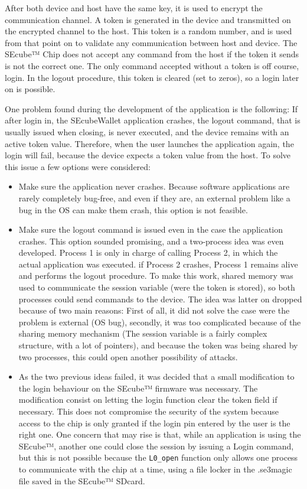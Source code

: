 After both device and host have the same key, it is used to encrypt the communication channel. A token is generated in the device and transmitted on the encrypted channel to the host. This token is a random number, and is used from that point on to validate any communication between host and device. The SEcube™ Chip does not accept any command from the host if the token it sends is not the correct one. The only command accepted without a token is off course, login. In the logout procedure, this token is cleared (set to zeros), so a login later on is possible.

One problem found during the development of the application is the following: If after login in, the SEcubeWallet application crashes, the logout command, that is usually issued when closing, is never executed, and the device remains with an active token value. Therefore, when the user launches the application again, the login will fail, because the device expects a token value from the host. To solve this issue a few options were considered:

\begin{itemize}
\setlength\itemsep{-3pt}

\item Make sure the application never crashes. Because software applications are rarely completely bug-free, and even if they are, an external problem like a bug in the OS can make them crash, this option is not feasible. 
\item Make sure the logout command is issued even in the case the application crashes. This option sounded promising, and a two-process idea was even developed. Process 1 is only in charge of calling Process 2, in which the actual application was executed. if Process 2 crashes, Process 1 remains alive and performs the logout procedure. To make this work, shared memory was used to communicate the session variable (were the token is stored), so both processes could send commands to the device. The idea was latter on dropped because of two main reasons: First of all, it did not solve the case were the problem is external (OS bug), secondly, it was too complicated because of the sharing memory mechanism (The session variable is a fairly complex structure, with a lot of pointers), and because the token was being shared by two processes, this could open another possibility of attacks.
\item As the two previous ideas failed, it was decided that a small modification to the login behaviour on the SEcube™ firmware was necessary. The modification consist on letting the login function clear the token field if necessary. This does not compromise the security of the system because access to the chip is only granted if the login pin entered by the user is the right one. One concern that may rise is that, while an application is using the SEcube™, another one could close the session by issuing a Login command, but this is not possible because the \texttt{L0\_open} function only allows one process to communicate with the chip at a time, using a file locker in the .se3magic
file saved in the SEcube™ SDcard.
\end{itemize} 

